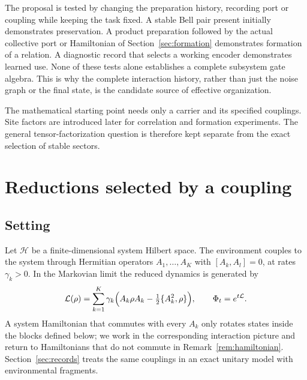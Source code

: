 \documentclass[12pt,a4paper]{article}
\newcommand{\Hil}{\mathcal H}
\begin{document}
The proposal is tested by changing the preparation history, recording
port or coupling while keeping the task fixed. A stable Bell pair
present initially demonstrates preservation. A product preparation
followed by the actual collective port or Hamiltonian of
Section~\ref{sec:formation} demonstrates formation of a relation.
A diagnostic record that selects a working encoder demonstrates learned
use. None of these tests alone establishes a complete subsystem gate
algebra. This is why the complete interaction history, rather than just
the noise graph or the final state, is the candidate source of effective
organization.

The mathematical starting point needs only a carrier and its specified
couplings. Site factors are introduced later for correlation and
formation experiments. The general tensor-factorization question is
therefore kept separate from the exact selection of stable sectors.

\section{Reductions selected by a coupling}
\label{sec:selected}

\subsection{Setting}

Let $\Hil$ be a finite-dimensional system Hilbert space. The environment couples to the system through Hermitian operators $A_1,\dots,A_K$ with $[A_k,A_l]=0$, at rates $\gamma_k>0$. In the Markovian limit the reduced dynamics is generated by
\begin{equation}
\mathcal L(\rho)=\sum_{k=1}^K\gamma_k\Bigl(A_k\rho A_k-\tfrac12\{A_k^2,\rho\}\Bigr),\qquad \Phi_t=e^{t\mathcal L}.
\label{eq:L}
\end{equation}
A system Hamiltonian that commutes with every $A_k$ only rotates states inside the blocks defined below; we work in the corresponding interaction picture and return to Hamiltonians that do not commute in Remark~\ref{rem:hamiltonian}. Section~\ref{sec:records} treats the same couplings in an exact unitary model with environmental fragments.
\end{document}
